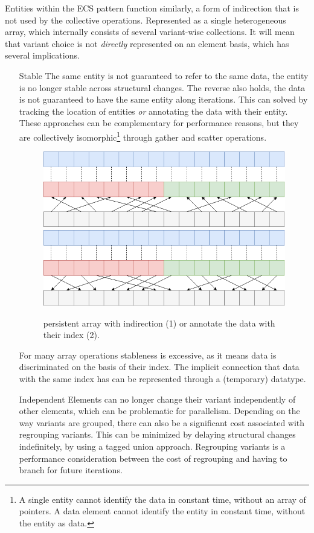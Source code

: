 \documentclass{article}
\begin{document}
Entities within the ECS pattern function similarly, a form of indirection that is not used by the collective operations. 
Represented as a single heterogeneous array, which internally consists of several variant-wise collections. 
It will mean that variant choice is not {\it directly} represented on an element basis, which has several implications.

\begin{itemize}
    \item [Stable] 
The same entity is not guaranteed to refer to the same data, the entity is no longer stable across structural changes.
The reverse also holds, the data is not guaranteed to have the same entity along iterations.
This can solved by tracking the location of entities {\it or} annotating the data with their entity. 
These approaches can be complementary for performance reasons, but they are collectively isomorphic\footnote{A single entity cannot identify the data in constant time, without an array of pointers. A data element cannot identify the entity in constant time, without the entity as data. } through gather and scatter operations. 

\begin{figure}[ht]
    \centering
    \includegraphics[scale=0.3]{stable1}
    \includegraphics[scale=0.3]{stable2}
    \caption{ persistent array with indirection (1) or annotate the data with their index (2). }
\end{figure}

For many array operations stableness is excessive, as it means data is discriminated on the basis of their index. 
The implicit connection that data with the same index has can be represented through a (temporary) datatype.

    \item [Independent]
Elements can no longer change their variant independently of other elements, which can be problematic for parallelism.
Depending on the way variants are grouped, there can also be a significant cost associated with regrouping variants.
This can be minimized by delaying structural changes indefinitely, by using a tagged union approach.
Regrouping variants is a performance consideration between the cost of regrouping and having to branch for future iterations.
\end{itemize}    
\end{document}
